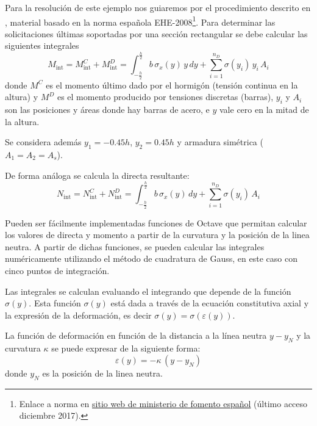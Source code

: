 Para la resolución de este ejemplo nos guiaremos por el procedimiento descrito en \citep{JimenezMontoya}, material basado en la norma española EHE-2008\footnote{Enlace a norma en \href{http://www.fomento.es/MFOM/LANG_CASTELLANO/ORGANOS_COLEGIADOS/MASORGANOS/CPH/instrucciones/EHE_es/}{sitio web de ministerio de fomento español} (último acceso diciembre 2017).}. %
%
Para determinar las solicitaciones últimas soportadas por una sección rectangular se debe calcular las siguientes integrales
%
\begin{equation}
M_{\text{int}} = M_{\text{int}}^C + M_{\text{int}}^D = \int_{-\frac{h}{2}}^{\frac{h}{2}} b \, \sigma_x(y) \, y \, dy + \sum_{i=1}^{n_D} \sigma(y_i) \, y_i \, A_i 
\end{equation}
%
donde $M^C$ es el momento último dado por el hormigón (tensión continua en la altura) y $M^D$ es el momento producido por tensiones discretas (barras), $y_i$ y $A_i$ son las posiciones y áreas donde hay barras de acero, e $y$ vale cero en la mitad de la altura. %
%

Se considera además $y_1=-0.45h$, $y_2=0.45h$ y armadura simétrica ($A_1 = A_2 = A_s$). %

De forma análoga se calcula la directa resultante:
%
\begin{equation}  
N_{\text{int}} = N_{\text{int}}^C + N_{\text{int}}^D = \int_{-\frac{h}{2}}^{\frac{h}{2}} b \, \sigma_x(y) \,  dy + \sum_{i=1}^{n_{D}} \sigma(y_i) \, A_i 
\end{equation}
%

Pueden ser fácilmente implementadas funciones de Octave que permitan calcular los valores de directa y momento a partir de la curvatura y la posición de la linea neutra. %
%
A partir de dichas funciones, se pueden calcular las integrales numéricamente utilizando el método de cuadratura de Gauss, en este caso con cinco puntos de integración. %

Las integrales se calculan evaluando el integrando que depende de la función $\sigma(y)$. %
%
Esta función $\sigma(y)$ está dada a través de la ecuación constitutiva axial y la expresión de la deformación, es decir $\sigma (y) = \sigma( \varepsilon ( y) )$. %

La función de deformación en función de la distancia a la línea neutra  $y - y_{N}$ y la curvatura $\kappa$ se puede expresar de la siguiente forma:
%
\begin{equation}
\varepsilon(y) = - \kappa \, (y - y_{N} ) 
\end{equation}
%
donde $y_N$ es la posición de la linea neutra.

